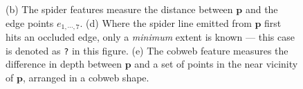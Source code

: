\documentclass[10pt,twocolumn,letterpaper]{article}
\newcommand{\point}{\mathbf{p}}
\begin{document}
\begin{figure}
{        \label{fig:features:occluded_spider}}
        \hfill
        \hfill
    \caption{
    (b) The spider features measure the distance between $\point$ and the edge points $e_{1, \cdots, 7}$.
    (d) Where the spider line emitted from $\point$ first hits an occluded edge, only a \textit{minimum} extent is known --- this case is denoted as \texttt{?} in this figure.
    (e) The cobweb feature measures the difference in depth between $\point$ and a set of points in the near vicinity of $\point$, arranged in a cobweb shape.}%
    \label{fig:features}
\end{figure}
\end{document}

